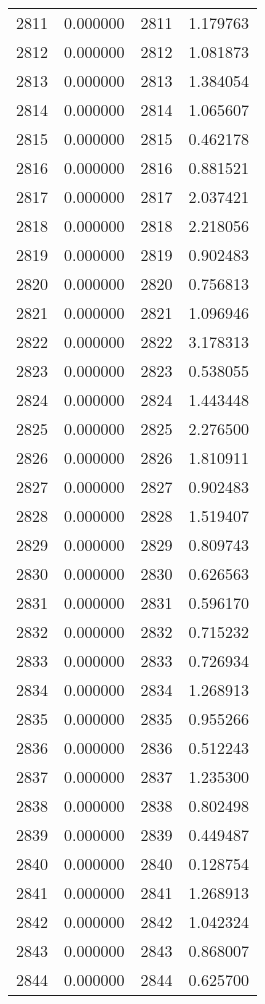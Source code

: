 \documentclass[12pt]{article}
\begin{document}
\begin{longtable}{@{}cccc@{}}
2811 & 0.000000 & 2811 & 1.179763 \\
2812 & 0.000000 & 2812 & 1.081873 \\
2813 & 0.000000 & 2813 & 1.384054 \\
2814 & 0.000000 & 2814 & 1.065607 \\
2815 & 0.000000 & 2815 & 0.462178 \\
2816 & 0.000000 & 2816 & 0.881521 \\
2817 & 0.000000 & 2817 & 2.037421 \\
2818 & 0.000000 & 2818 & 2.218056 \\
2819 & 0.000000 & 2819 & 0.902483 \\
2820 & 0.000000 & 2820 & 0.756813 \\
2821 & 0.000000 & 2821 & 1.096946 \\
2822 & 0.000000 & 2822 & 3.178313 \\
2823 & 0.000000 & 2823 & 0.538055 \\
2824 & 0.000000 & 2824 & 1.443448 \\
2825 & 0.000000 & 2825 & 2.276500 \\
2826 & 0.000000 & 2826 & 1.810911 \\
2827 & 0.000000 & 2827 & 0.902483 \\
2828 & 0.000000 & 2828 & 1.519407 \\
2829 & 0.000000 & 2829 & 0.809743 \\
2830 & 0.000000 & 2830 & 0.626563 \\
2831 & 0.000000 & 2831 & 0.596170 \\
2832 & 0.000000 & 2832 & 0.715232 \\
2833 & 0.000000 & 2833 & 0.726934 \\
2834 & 0.000000 & 2834 & 1.268913 \\
2835 & 0.000000 & 2835 & 0.955266 \\
2836 & 0.000000 & 2836 & 0.512243 \\
2837 & 0.000000 & 2837 & 1.235300 \\
2838 & 0.000000 & 2838 & 0.802498 \\
2839 & 0.000000 & 2839 & 0.449487 \\
2840 & 0.000000 & 2840 & 0.128754 \\
2841 & 0.000000 & 2841 & 1.268913 \\
2842 & 0.000000 & 2842 & 1.042324 \\
2843 & 0.000000 & 2843 & 0.868007 \\
2844 & 0.000000 & 2844 & 0.625700 \\

\end{longtable}
\end{document}
